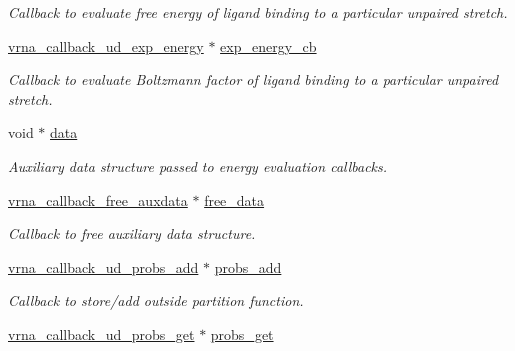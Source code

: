 \begin{DoxyCompactItemize}
\begin{DoxyCompactList}\small\item\em Callback to evaluate free energy of ligand binding to a particular unpaired stretch. \end{DoxyCompactList}\item 
\hyperlink{group__domains__up_ga79eb0224b0b6e0a86c9e8c4a1b0cad04}{vrna\+\_\+callback\+\_\+ud\+\_\+exp\+\_\+energy} $\ast$ \hyperlink{group__domains__up_ad5aaa2530557880ae89e297f8f09aa55}{exp\+\_\+energy\+\_\+cb}\hypertarget{group__domains__up_ad5aaa2530557880ae89e297f8f09aa55}{}\label{group__domains__up_ad5aaa2530557880ae89e297f8f09aa55}

\begin{DoxyCompactList}\small\item\em Callback to evaluate Boltzmann factor of ligand binding to a particular unpaired stretch. \end{DoxyCompactList}\item 
void $\ast$ \hyperlink{group__domains__up_a8802b1b0512999a9f35202031811ce17}{data}\hypertarget{group__domains__up_a8802b1b0512999a9f35202031811ce17}{}\label{group__domains__up_a8802b1b0512999a9f35202031811ce17}

\begin{DoxyCompactList}\small\item\em Auxiliary data structure passed to energy evaluation callbacks. \end{DoxyCompactList}\item 
\hyperlink{group__fold__compound_ga3ae51bfd5fc3236652d1de4e3274b49b}{vrna\+\_\+callback\+\_\+free\+\_\+auxdata} $\ast$ \hyperlink{group__domains__up_a21b3084846902172858bc53f113d05a4}{free\+\_\+data}\hypertarget{group__domains__up_a21b3084846902172858bc53f113d05a4}{}\label{group__domains__up_a21b3084846902172858bc53f113d05a4}

\begin{DoxyCompactList}\small\item\em Callback to free auxiliary data structure. \end{DoxyCompactList}\item 
\hyperlink{group__domains__up_gacf121219e336f14d288a304564307f67}{vrna\+\_\+callback\+\_\+ud\+\_\+probs\+\_\+add} $\ast$ \hyperlink{group__domains__up_a457b43dfab7f4321b5d7a84e5deea5d7}{probs\+\_\+add}\hypertarget{group__domains__up_a457b43dfab7f4321b5d7a84e5deea5d7}{}\label{group__domains__up_a457b43dfab7f4321b5d7a84e5deea5d7}

\begin{DoxyCompactList}\small\item\em Callback to store/add outside partition function. \end{DoxyCompactList}\item 
\hyperlink{group__domains__up_ga13eb77d5c404b08a8868e382a66ab8bb}{vrna\+\_\+callback\+\_\+ud\+\_\+probs\+\_\+get} $\ast$ \hyperlink{group__domains__up_a0b155283bccf65c5253f31e0211ae8ff}{probs\+\_\+get}\hypertarget{group__domains__up_a0b155283bccf65c5253f31e0211ae8ff}{}\label{group__domains__up_a0b155283bccf65c5253f31e0211ae8ff}


\end{DoxyCompactItemize}
